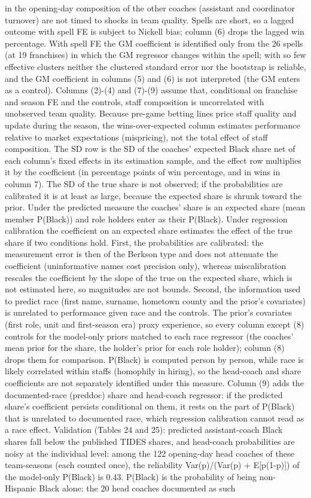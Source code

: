 {in the opening-day composition of the other coaches (assistant and coordinator turnover) are not timed to shocks in team quality. Spells are short, so a lagged outcome with spell FE is subject to Nickell bias; column (6) drops the lagged win percentage. With spell FE the GM coefficient is identified only from the 26 spells (at 19 franchises) in which the GM regressor changes within the spell; with so few effective clusters neither the clustered standard error nor the bootstrap is reliable, and the GM coefficient in columns (5) and (6) is not interpreted (the GM enters as a control). Columns (2)-(4) and (7)-(9) assume that, conditional on franchise and season FE and the controls, staff composition is uncorrelated with unobserved team quality. Because pre-game betting lines price staff quality and update during the season, the wins-over-expected column estimates performance relative to market expectations (mispricing), not the total effect of staff composition. The SD row is the SD of the coaches' expected Black share net of each column's fixed effects in its estimation sample, and the effect row multiplies it by the coefficient (in percentage points of win percentage, and in wins in column 7). The SD of the true share is not observed; if the probabilities are calibrated it is at least as large, because the expected share is shrunk toward the prior. Under the predicted measure the coaches' share is an expected share (mean member P(Black)) and role holders enter as their P(Black). Under regression calibration the coefficient on an expected share estimates the effect of the true share if two conditions hold. First, the probabilities are calibrated: the measurement error is then of the Berkson type and does not attenuate the coefficient (uninformative names cost precision only), whereas miscalibration rescales the coefficient by the slope of the true on the expected share, which is not estimated here, so magnitudes are not bounds. Second, the information used to predict race (first name, surname, hometown county and the prior's covariates) is unrelated to performance given race and the controls. The prior's covariates (first role, unit and first-season era) proxy experience, so every column except (8) controls for the model-only priors matched to each race regressor (the coaches' mean prior for the share, the holder's prior for each role holder); column (8) drops them for comparison. P(Black) is computed person by person, while race is likely correlated within staffs (homophily in hiring), so the head-coach and share coefficients are not separately identified under this measure. Column (9) adds the documented-race (preddoc) share and head-coach regressor: if the predicted share's coefficient persists conditional on them, it rests on the part of P(Black) that is unrelated to documented race, which regression calibration cannot read as a race effect. Validation (Tables 24 and 25): predicted assistant-coach Black shares fall below the published TIDES shares, and head-coach probabilities are noisy at the individual level: among the 122 opening-day head coaches of these team-seasons (each counted once), the reliability Var(p)/(Var(p) + E[p(1-p)]) of the model-only P(Black) is 0.43. P(Black) is the probability of being non-Hispanic Black alone: the 20 head coaches documented as such }
